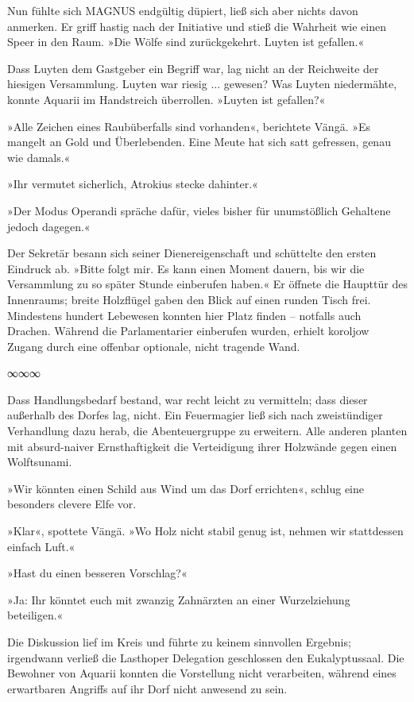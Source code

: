 Nun fühlte sich MAGNUS endgültig düpiert, ließ sich aber nichts davon anmerken. Er griff hastig nach der Initiative und stieß die Wahrheit wie einen Speer in den Raum. »Die Wölfe sind zurückgekehrt. Luyten ist gefallen.«

Dass Luyten dem Gastgeber ein Begriff war, lag nicht an der Reichweite der hiesigen Versammlung. Luyten war riesig ... gewesen? Was Luyten niedermähte, konnte Aquarii im Handstreich überrollen. »Luyten ist gefallen?«

»Alle Zeichen eines Raubüberfalls sind vorhanden«, berichtete Vängä. »Es mangelt an Gold und Überlebenden. Eine Meute hat sich satt gefressen, genau wie damals.«

»Ihr vermutet sicherlich, Atrokius stecke dahinter.«

»Der Modus Operandi spräche dafür, vieles bisher für unumstößlich Gehaltene jedoch dagegen.«

Der Sekretär besann sich seiner Dienereigenschaft und schüttelte den ersten Eindruck ab. »Bitte folgt mir. Es kann einen Moment dauern, bis wir die Versammlung zu so später Stunde einberufen haben.« Er öffnete die Haupttür des Innenraums; breite Holzflügel gaben den Blick auf einen runden Tisch frei. Mindestens hundert Lebewesen konnten hier Platz finden – notfalls auch Drachen. Während die Parlamentarier einberufen wurden, erhielt koroljow Zugang durch eine offenbar optionale, nicht tragende Wand.

\begin{center}
∞∞∞
\end{center}

Dass Handlungsbedarf bestand, war recht leicht zu vermitteln; dass dieser außerhalb des Dorfes lag, nicht. Ein Feuermagier ließ sich nach zweistündiger Verhandlung dazu herab, die Abenteuergruppe zu erweitern. Alle anderen planten mit absurd-naiver Ernsthaftigkeit die Verteidigung ihrer Holzwände gegen einen Wolftsunami.

»Wir könnten einen Schild aus Wind um das Dorf errichten«, schlug eine besonders clevere Elfe vor.

»Klar«, spottete Vängä. »Wo Holz nicht stabil genug ist, nehmen wir stattdessen einfach Luft.«

»Hast du einen besseren Vorschlag?«

»Ja: Ihr könntet euch mit zwanzig Zahnärzten an einer Wurzelziehung beteiligen.«

Die Diskussion lief im Kreis und führte zu keinem sinnvollen Ergebnis; irgendwann verließ die Lasthoper Delegation geschlossen den Eukalyptussaal. Die Bewohner von Aquarii konnten die Vorstellung nicht verarbeiten, während eines erwartbaren Angriffs auf ihr Dorf nicht anwesend zu sein.

